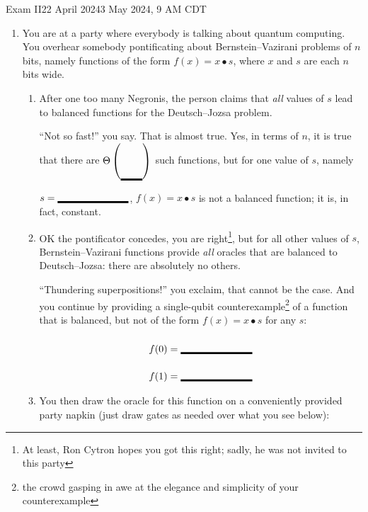 \documentclass[12pt]{article}
\newcommand{\Blank}[1][1in]{\mbox{\vrule width #1 depth 2pt}\vrule width 0pt height 2.0em}
\begin{document}
\begin{assignment}{Exam II}{22 April 2024}{3 May 2024, 9 AM CDT}
\begin{enumerate}
\begin{enumerate}
    \item This is an instance of Grover for a function, where the input values are~\Blank[3em]{} bits wide.
    \item From $\ket{\psi_{f}}$ shown above, what is the secret  (the input value that Grover is trying to find)?~\Blank{}
    \item This is the first step of the \Blank{} iteration of the algorithm.
    \item When we complete this iteration by performing diffusion, the amplitude on  will be approximately \Blank{}, because it increases each iteration on a problem of this size by approximately~\Blank{}.
    
    
\end{enumerate}

\clearpage\item{} You are at a party where everybody is talking about quantum computing.  You overhear somebody pontificating about Bernstein--Vazirani problems of $n$ bits, namely functions of the form
\( f(x) = x \bullet s \),
where $x$ and $s$ are each $n$ bits wide.  

\begin{enumerate}
\item{} After one too many Negronis, the person claims that \emph{all} values of $s$ lead to balanced functions for the Deutsch--Jozsa problem.

``Not so fast!'' you say.  That is almost true.  Yes, in terms of $n$, it is true that there are $\Theta\left(\mbox{\vrule width 0pt height 2em depth 0pt\raisebox{-1.5em}{\Blank[2.2em]}}\right)$ such functions, but for one value of $s$, namely $s=\Blank{}$, $f(x)=x\bullet s$ is not a balanced function; it is, in fact, constant.

\item{} OK the pontificator concedes, you are right\footnote{At least, Ron Cytron hopes you got this right; sadly, he was not invited to this party}, but for all other values of $s$,  Bernstein--Vazirani functions provide \emph{all} oracles that are balanced to Deutsch--Jozsa: there are absolutely no others.

``Thundering superpositions!'' you exclaim, that cannot be the case.  And you continue by providing a single-qubit counterexample\footnote{the crowd gasping in awe at the elegance and simplicity of your counterexample} of a function that is balanced, but not of the form $f(x)=x\bullet s$ for any $s$:
\begin{align*}
    f(0) &= \Blank{} \\
    f(1) &= \Blank{}
\end{align*}
\item{} You then draw the oracle for this function on a conveniently provided party napkin (just draw gates as needed over what you see below):


\end{enumerate}
\end{enumerate}
\end{assignment}
\end{document}
